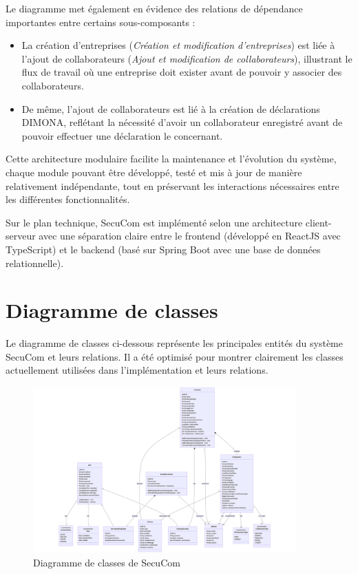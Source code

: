 Le diagramme met également en évidence des relations de dépendance importantes entre certains sous-composants :
\begin{itemize}
  \item La création d'entreprises (\textit{Création et modification d'entreprises}) est liée à l'ajout de collaborateurs (\textit{Ajout et modification de collaborateurs}), illustrant le flux de travail où une entreprise doit exister avant de pouvoir y associer des collaborateurs.
  \item De même, l'ajout de collaborateurs est lié à la création de déclarations DIMONA, reflétant la nécessité d'avoir un collaborateur enregistré avant de pouvoir effectuer une déclaration le concernant.
\end{itemize}

Cette architecture modulaire facilite la maintenance et l'évolution du système, chaque module pouvant être développé, testé et mis à jour de manière relativement indépendante, tout en préservant les interactions nécessaires entre les différentes fonctionnalités.

Sur le plan technique, SecuCom est implémenté selon une architecture client-serveur avec une séparation claire entre le frontend (développé en ReactJS avec TypeScript) et le backend (basé sur Spring Boot avec une base de données relationnelle).

\section{Diagramme de classes}

Le diagramme de classes ci-dessous représente les principales entités du système SecuCom et leurs relations. Il a été optimisé pour montrer clairement les classes actuellement utilisées dans l'implémentation et leurs relations.

\begin{figure}[h]
\centering
\includegraphics[width=0.9\textwidth]{ClassDiagram.png}
\caption{Diagramme de classes de SecuCom}
\end{figure}


